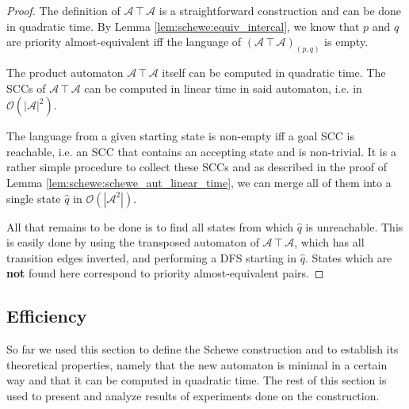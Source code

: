 \begin{proof}
	The definition of $\mathcal{A} \intercal \mathcal{A}$ is a straightforward construction and can be done in quadratic time. By Lemma \ref{lem:schewe:equiv_intercal}, we know that $p$ and $q$ are priority almost-equivalent iff the language of $(\mathcal{A} \intercal \mathcal{A})_{(p,q)}$ is empty. 

	The product automaton $\mathcal{A} \intercal \mathcal{A}$ itself can be computed in quadratic time. The SCCs of $\mathcal{A} \intercal \mathcal{A}$ can be computed in linear time in said automaton, i.e. in $\mathcal{O}(|\mathcal{A}|^2)$.
	
	The language from a given starting state is non-empty iff a goal SCC is reachable, i.e. an SCC that contains an accepting state and is non-trivial. It is a rather simple procedure to collect these SCCs and as described in the proof of Lemma \ref{lem:schewe:schewe_aut_linear_time}, we can merge all of them into a single state $\hat{q}$ in $\mathcal{O}(|\mathcal{A}^2|)$.
	
	All that remains to be done is to find all states from which $\hat{q}$ is unreachable. This is easily done by using the transposed automaton of $\mathcal{A} \intercal \mathcal{A}$, which has all transition edges inverted, and performing a DFS starting in $\hat{q}$. States which are \textbf{not} found here correspond to priority almost-equivalent pairs.
\end{proof}


\newpage



\subsection{Efficiency}
So far we used this section to define the Schewe construction and to establish its theoretical properties, namely that the new automaton is minimal in a certain way and that it can be computed in quadratic time. The rest of this section is used to present and analyze results of experiments done on the construction. 

